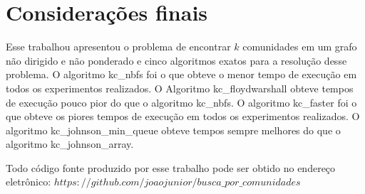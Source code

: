 \section{Considerações finais}\label{sec:consideracoes} 
Esse trabalhou apresentou o problema de encontrar $k$ comunidades em um grafo não dirigido e não ponderado e
cinco algoritmos exatos para a resolução desse problema. O algoritmo kc\_nbfs foi o que obteve o menor
tempo de execução em todos os experimentos realizados. O Algoritmo kc\_floydwarshall obteve tempos de execução
pouco pior do que o algoritmo kc\_nbfs.  O algoritmo kc\_faster foi o que obteve os piores tempos de execução em todos
os experimentos realizados. O algoritmo kc\_johnson\_min\_queue obteve tempos sempre melhores do que o algoritmo
kc\_johnson\_array.


Todo código fonte produzido por esse trabalho pode ser obtido no endereço eletrônico:
$https://github.com/joaojunior/busca\_por\_comunidades$